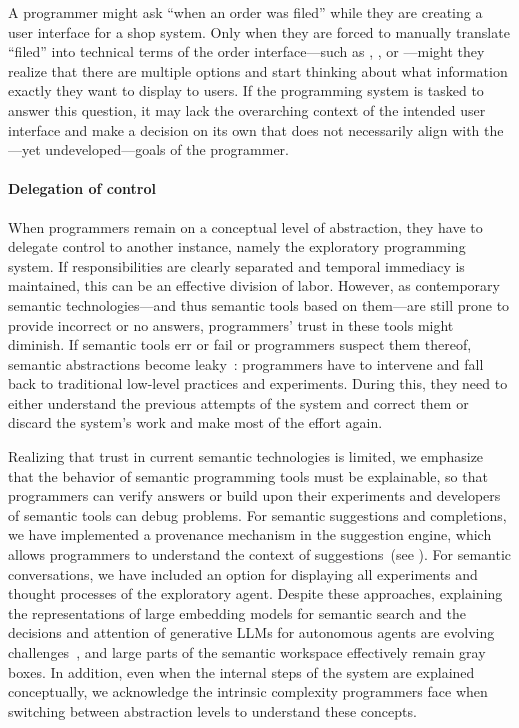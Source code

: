 \begin{example}
	A programmer might ask ``when an order was filed'' while they are creating a user interface for a shop system.
	Only when they are forced to manually translate ``filed'' into technical terms of the order interface---such as , , or ---might they realize that there are multiple options and start thinking about what information exactly they want to display to users.
	If the programming system is tasked to answer this question, it may lack the overarching context of the intended user interface and make a decision on its own that does not necessarily align with the---yet undeveloped---goals of the programmer.
\end{example}

\paragraph{Delegation of control}
\label{par:discussion/experience/process/delegation}

When programmers remain on a conceptual level of abstraction, they have to delegate control to another instance, namely the exploratory programming system.
If responsibilities are clearly separated and temporal immediacy is maintained, this can be an effective division of labor.
However, as contemporary semantic technologies---and thus semantic tools based on them---are still prone to provide incorrect or no answers, programmers' trust in these tools might diminish.
If semantic tools err or fail or programmers suspect them thereof, semantic abstractions become leaky~\cite[chap. 26]{spolsky2004joel}: programmers have to intervene and fall back to traditional low-level practices and experiments.
During this, they need to either understand the previous attempts of the system and correct them or discard the system's work and make most of the effort again.

Realizing that trust in current semantic technologies is limited, we emphasize that the behavior of semantic programming tools must be explainable, so that programmers can verify answers or build upon their experiments and developers of semantic tools can debug problems.
For semantic suggestions and completions, we have implemented a provenance mechanism in the suggestion engine, which allows programmers to understand the context of suggestions~(see ).
For semantic conversations, we have included an option for displaying all experiments and thought processes of the exploratory agent.
Despite these approaches, explaining the representations of large embedding models for semantic search and the decisions and attention of generative LLMs for autonomous agents are evolving challenges~\cites{chefer2021generic}[sec.~8.1.3]{zhao2023survey}, and large parts of the semantic workspace effectively remain gray boxes.
In addition, even when the internal steps of the system are explained conceptually, we acknowledge the intrinsic complexity programmers face when switching between abstraction levels to understand these concepts.

